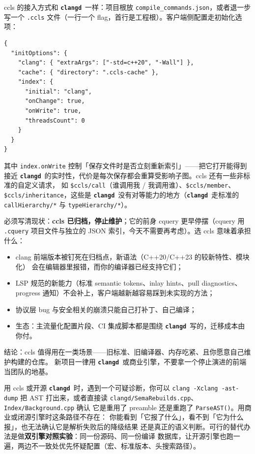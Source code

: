 \documentclass[12pt,a4paper,fontset=fandol]{ctexbook}
\newcommand{\cpp}[1]{C++#1}
\newcommand{\Fn}[1]{\texttt{#1()}}
\newcommand{\Bk}{\discretionary{}{}{}}
\newcommand{\Lib}[1]{\textbf{\texttt{#1}}}
\newcommand{\CD}{\Lib{clangd}}
\begin{document}
ccls 的接入方式和 \CD\ 一样：项目根放 \texttt{compile\_commands.json}，或者退一步写一个
\texttt{.ccls} 文件（一行一个 flag，首行是工程根）。客户端侧配置走初始化选项：

\begin{lstlisting}[style=jsonstyle,caption={ccls 的初始化选项片段（不同客户端的外层键名略有差别）},label={lst:ch06-ccls}]
{
  "initOptions": {
    "clang": { "extraArgs": ["-std=c++20", "-Wall"] },
    "cache": { "directory": ".ccls-cache" },
    "index": {
      "initial": "clang",
      "onChange": true,
      "onWrite": true,
      "threadsCount": 0
    }
  }
}
\end{lstlisting}

其中 \texttt{index.onWrite} 控制「保存文件时是否立刻重新索引」——把它打开能得到
接近 \CD\ 的实时性，代价是每次保存都会重算受影响子图。ccls 还有一些非标准的自定义请求，
如 \texttt{\$ccls/call}（谁调用我 / 我调用谁）、\texttt{\$ccls/member}、
\texttt{\$ccls/inheritance}，这些是 \CD\ 没有对等能力的地方（\CD\ 走标准的
\texttt{callHierarchy/*} 与 \texttt{typeHierarchy/*}）。

必须写清现状：\textbf{ccls 已归档，停止维护}；它的前身 cquery 更早停摆（cquery 用
\texttt{.cquery} 项目文件与独立的 JSON 索引，今天不需要再考虑）。选 ccls 意味着承担什么：

\begin{itemize}
  \item clang 前端版本被钉死在归档点，新语法（\cpp{20}/{\Bk}\cpp{23} 的较新特性、模块化）
        会在编辑器里报错，而你的编译器已经支持它们；
  \item LSP 规范的新能力（标准 semantic tokens、inlay hints、pull diagnostics、
        progress 通知）不会补上，客户端越新越容易踩到未实现的方法；
  \item 协议层 bug 与安全相关的崩溃只能自己打补丁、自己编译；
  \item 生态：主流量化配置片段、CI 集成脚本都是围绕 \CD\ 写的，迁移成本由你付。
\end{itemize}

结论：ccls 值得用在一类场景——旧标准、旧编译器、内存吃紧、且你愿意自己维护构建的仓库。
新项目一律用 \CD\ 或商业引擎，不要拿一个停止演进的前端当团队的地基。

\begin{note}[title={闭源引擎的误报无法自查根因}]
用 ccls 或开源 \CD\ 时，遇到一个可疑诊断，你可以 \texttt{clang -Xclang -ast-dump} 把 AST
打出来，或者直接读 \texttt{clangd/SemaRebuilds.cpp}、\texttt{Index/Background.cpp} 确认
它是重用了 preamble 还是重跑了 \Fn{ParseAST}。用商业或闭源引擎时这条路径不存在：
你能看到「它报了什么」，看不到「它为什么报」，也无法确认它是解析失败后的降级结果
还是真正的语义判断。可行的替代办法是做\textbf{双引擎对照实验}：同一份源码、同一份编译
数据库，让开源引擎也跑一遍，两边不一致处优先怀疑配置（宏、标准版本、头搜索路径）。
\end{note}
\end{document}
